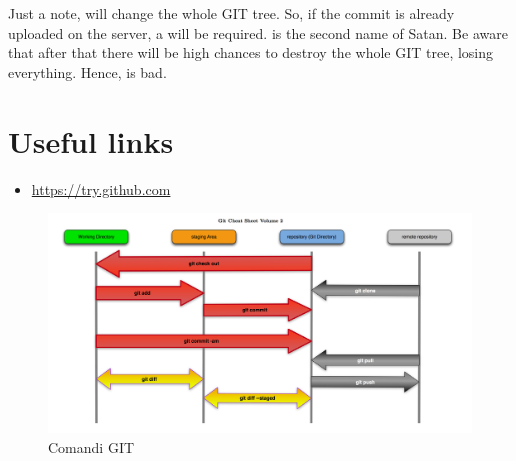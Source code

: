 Just a note,  will change the whole GIT tree. So, 
if the commit is already uploaded on  the server, a  will be
required.   is the second name of Satan. Be aware that
after that there will be high chances to destroy the whole GIT tree, losing
everything. Hence,  is bad.

\section{Useful links}
\begin{itemize}
\item \url{https://try.github.com}
\end{itemize}

\begin{figure}[h]
	\centering
	\includegraphics[width=\textwidth]{gfx/git_graph}
	
	\caption{Comandi GIT}
	\label{Fig:Commands}
\end{figure}